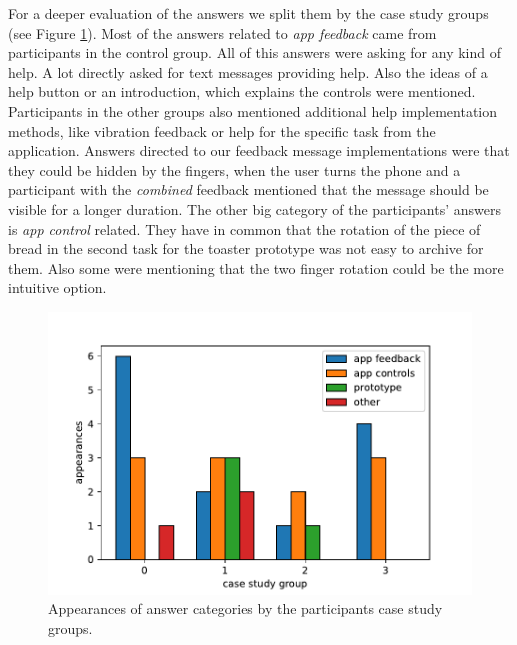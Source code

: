 \documentclass[11pt, a4paper]{article}
\begin{document}
			For a deeper evaluation of the answers we split them by the case study groups (see Figure \ref{fig:tags_imp}). 
			Most of the answers related to \emph{app feedback} came from participants in the control group. All of this answers were asking for any kind of help. A lot directly asked for text messages providing help. Also the ideas of a help button or an introduction, which explains the controls were mentioned. Participants in the other groups also mentioned additional help implementation methods, like vibration feedback or help for the specific task from the application. Answers directed to our feedback message implementations were that they could be hidden by the fingers, when the user turns the phone and a participant with the \emph{combined} feedback mentioned that the message should be visible for a longer duration. The other big category of the participants' answers is \emph{app control} related. They have in common that the rotation of the piece of bread in the second task for the toaster prototype was not easy to archive for them. Also some were mentioning that the two finger rotation could be the more intuitive option.

			\begin{figure}[H]
				\centering
				\includegraphics[width=.49\textwidth]{img/plot/plot_tags_implementations.pdf}
				\caption{Appearances of answer categories by the participants case study groups.}
				\label{fig:tags_imp}
			\end{figure}
\end{document}
